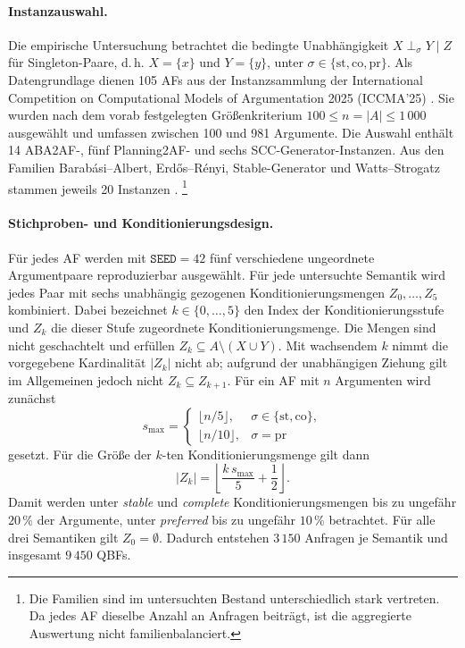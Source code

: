 \paragraph{Instanzauswahl.}
Die empirische Untersuchung betrachtet die bedingte Unabhängigkeit
\(X\perp_\sigma Y\mid Z\) für Singleton-Paare, d.\,h. \(X=\{x\}\) und
\(Y=\{y\}\), unter
\(\sigma\in\{\mathrm{st},\mathrm{co},\mathrm{pr}\}\). Als Datengrundlage
dienen 105 AFs aus der Instanzsammlung der International Competition on
Computational Models of Argumentation 2025 (ICCMA'25)
\parencite{apostolakis:2025:iccma-instances}. Sie wurden
nach dem vorab festgelegten Größenkriterium
\(100\leq n=\lvert A\rvert\leq 1\,000\)
ausgewählt und umfassen zwischen 100 und 981 Argumente. Die Auswahl enthält 14
ABA2AF-, fünf Planning2AF- und sechs SCC-Generator-Instanzen. Aus den Familien
Barabási--Albert, Erdős--Rényi, Stable-Generator und Watts--Strogatz stammen
jeweils 20 Instanzen \parencite{apostolakis:2025:iccma-instances}.%
\footnote{Die Familien sind im untersuchten Bestand unterschiedlich stark
vertreten. Da jedes AF dieselbe Anzahl an Anfragen beiträgt, ist die
aggregierte Auswertung nicht familienbalanciert.}

\paragraph{Stichproben- und Konditionierungsdesign.}
Für jedes AF werden mit \(\texttt{SEED}=42\) fünf verschiedene ungeordnete
Argumentpaare reproduzierbar ausgewählt. Für jede untersuchte Semantik wird
jedes Paar mit sechs unabhängig gezogenen Konditionierungsmengen
\(Z_0,\ldots,Z_5\) kombiniert. Dabei bezeichnet
\(k\in\{0,\ldots,5\}\) den Index der Konditionierungsstufe und \(Z_k\) die
dieser Stufe zugeordnete Konditionierungsmenge. Die Mengen sind nicht
geschachtelt und erfüllen \(Z_k\subseteq A\setminus(X\cup Y)\). Mit
wachsendem \(k\) nimmt die vorgegebene Kardinalität \(\lvert Z_k\rvert\)
nicht ab; aufgrund der unabhängigen Ziehung gilt im Allgemeinen jedoch nicht
\(Z_k\subseteq Z_{k+1}\). Für ein AF mit \(n\) Argumenten wird zunächst
\[
    s_{\max}=
    \begin{cases}
        \lfloor n/5\rfloor,
            & \sigma\in\{\mathrm{st},\mathrm{co}\},\\
        \lfloor n/10\rfloor,
            & \sigma=\mathrm{pr}
    \end{cases}
\]
gesetzt. Für die Größe der \(k\)-ten Konditionierungsmenge gilt dann
\[
    \lvert Z_k\rvert=
    \left\lfloor\frac{k\,s_{\max}}{5}+\frac{1}{2}\right\rfloor.
\]
Damit werden unter \emph{stable} und \emph{complete} Konditionierungsmengen
bis zu ungefähr \(20\,\%\) der Argumente, unter \emph{preferred} bis zu
ungefähr \(10\,\%\) betrachtet. Für alle drei Semantiken gilt
\(Z_0=\emptyset\). Dadurch entstehen \(3\,150\) Anfragen je Semantik und
insgesamt \(9\,450\) QBFs.

